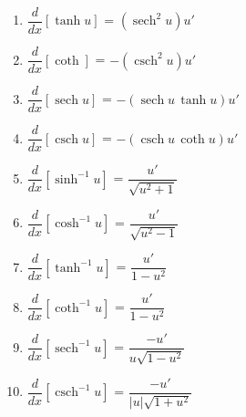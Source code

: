 \documentclass[10pt]{article}
\newcommand{\ddx}[1]{ $ \dfrac{d}{dx} \left[ #1 \right] $ }
\newcommand{\m}[1]{ $ \displaystyle #1 $ }
\DeclareMathOperator{\sech}{sech}
\DeclareMathOperator{\csch}{csch}
\begin{document}
\begin{center}
{\begin{minipage}{0.98\textwidth}
\begin{multicols}{3}
\begin{enumerate}
		\item \ddx{\tanh u } = \m{(\sech^2 u) u'}
		\item \ddx{\coth} = \m{-(\csch^2 u)u'}
		\item \ddx{\sech u} = \m{-(\sech u \, \tanh u)u'}
		\item \ddx{\csch u} = \m{-(\csch u\, \coth u)u'}
		\item \ddx{\sinh^{-1} u} = \m{\dfrac{u'}{\sqrt{u^2 + 1}}}
		\item \ddx{\cosh^{-1} u} = \m{\dfrac{u'}{\sqrt{u^2 - 1}}}
		\item \ddx{\tanh^{-1} u} = \m{\dfrac{u'}{1 - u^2}}
		\item \ddx{\coth^{-1} u} = \m{\dfrac{u'}{1 - u^2}}
		\item \ddx{\sech^{-1} u} = \m{\dfrac{-u'}{u \sqrt{1 - u^2}}}
		\item \ddx{\csch^{-1} u} = \m{\dfrac{-u'}{| u | \sqrt{1 + u^2}}}
	\end{enumerate}
	\end{multicols}


\end{minipage}}
\end{center}
\end{document}
